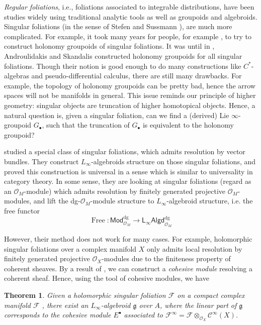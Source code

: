 \documentclass[12pt]{amsart}
\newtheorem{theorem}{Theorem}[section]
\theoremstyle{definition}
\theoremstyle{remark}
\numberwithin{equation}{section}
\newcommand{\CF}{{\mathcal F}}
\newcommand{\CO}{{\mathcal O}}
\newcommand{\cinf}{{\mathcal C}^{\infty}}
\newcommand{\1}{{\mathbb{1}}}
\newcommand{\g}{\mathfrak{g}}
\newcommand{\Mod}{\mathsf{Mod}}
\newcommand{\lalgd}{\mathsf{L_{\infty}Algd}^{\operatorname{dg}}}
\newcommand{\bt}{\bullet}
\newcommand{\free}{{\operatorname{Free}}}
\newcommand{\dg}{{\operatorname{dg}}}
\begin{document}
{\it  Regular foliations}, i.e., foliations associated to integrable distributions, have been studies widely using traditional analytic tools as well as groupoids and algebroids. Singular foliations (in the sense of Stefen \cite{Ste74} and Sussmann \cite{Sus73}), are much more complicated. For example, it took many years for people, for example \cite{Pra85} \cite{Deb00}\cite{Deb01},  to try to construct holonomy groupoids of singular foliations.
It was until in \cite{AS06}, Androulidakis and Skandalis constructed holonomy groupoids for all singular foliations. Though their notion is good enough to do many constructions like $C^*$-algebras and pseudo-differential calculus, there are still many drawbacks. For example, the topology of holonomy groupoids can be pretty bad, hence the arrow spaces will not be manifolds in general. This issue reminds our principle of higher geometry: singular objects are truncation of higher homotopical objects. Hence, a natural question is, given a singular foliation, can we find a (derived) Lie $\infty$-groupoid $G_{\bt}$, such that the truncation of $G_{\bt}$ is equivalent to the holonomy groupoid?

\cite{LLS20} studied a special class of singular foliations, which admits resolution by  vector bundles. They construct $L_{\infty}$-algebroids structure on those singular foliations, and proved this construction is universal in a sense which is similar to universality in category theory. In some sense, they are looking at singular foliations (regard as an $\CO_M$-module) which admits resolution by finitely generated projective $\CO_M$-modules, and lift the dg-$\CO_M$-module structure to $L_{\infty}$-algebroid structure, i.e. the free functor
\begin{equation*}
    \free: \Mod_{\CO_M}^{\dg} \to \lalgd_{\CO_M}
\end{equation*}

However, their method does not work for many cases. For example, holomorphic singular foliations over a complex manifold $X$ only admits local resolution by finitely generated projective $\CO_X$-modules due to the finiteness property of coherent sheaves. By a result of \cite{Blo05}, we can construct a {\it cohesive module} resolving a coherent sheaf. Hence, using the tool of cohesive modules, we have
\begin{theorem}
	Given a holomorphic singular foliation $\CF$ on a compact complex manifold $\CF$ , there exist an $L_{\infty}$-algebroid $\g$ over $A$, where the linear part of $\g$ corresponds to the cohesive module $E^{\bullet}$ associated to $\CF^{\infty} = \CF\otimes_{\CO_X} \cinf(X)$.
\end{theorem}
\end{document}

